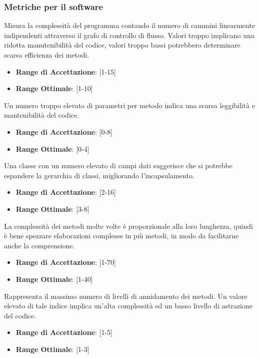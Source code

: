 \documentclass[12pt,a4paper]{article}
\begin{document}
\subsubsection{ Metriche per il software}\label{metriche_sw}
Misura la complessità del programma contando il numero di cammini linearmente indipendenti attraverso il grafo di controllo di flusso. Valori troppo implicano una ridotta manutenibilità del codice, valori troppo bassi potrebbero determinare scarsa efficienza dei metodi.
\begin{itemize}
\item \textbf{Range di Accettazione}: [1-15]
\item \textbf{Range Ottimale}: [1-10]
\end{itemize}
Un numero troppo elevato di parametri per metodo indica una scarsa leggibilità e mantenibilità del codice.
\begin{itemize}
\item \textbf{Range di Accettazione}: [0-8]
\item \textbf{Range Ottimale}: [0-4]
\end{itemize}
Una classe con un numero elevato di campi dati suggerisce che si potrebbe espandere la gerarchia di classi, migliorando l'incapsulamento.
\begin{itemize}
\item \textbf{Range di Accettazione}: [2-16]
\item \textbf{Range Ottimale}: [3-8]
\end{itemize}
La complessità dei metodi molte volte è proporzionale alla loro lunghezza,
quindi è bene spezzare elaborazioni complesse in più metodi, in modo da facilitarne anche la comprensione.
\begin{itemize}
\item \textbf{Range di Accettazione}: [1-70]
\item \textbf{Range Ottimale}: [1-40]
\end{itemize}
Rappresenta il massimo numero di livelli di annidamento dei metodi. Un valore elevato di tale indice implica un’alta complessità ed un basso livello di astrazione del codice.
\begin{itemize}
\item \textbf{Range di Accettazione}: [1-5]
\item \textbf{Range Ottimale}: [1-3]
\end{itemize}
\end{document}
